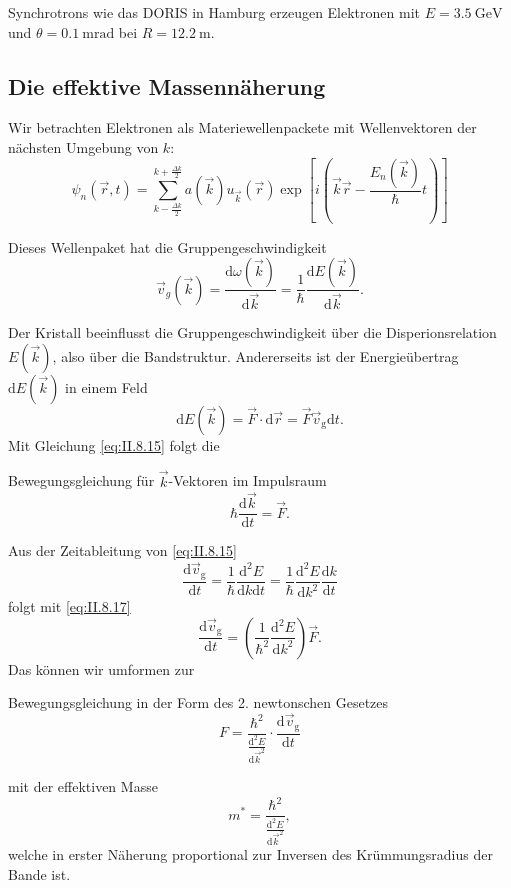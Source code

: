 	Synchrotrons wie das DORIS in Hamburg erzeugen Elektronen mit $E=\SI{3,5}{\giga\electronvolt}$ und $\theta=\SI{0,1}{\milli\radian}$ bei $R=\SI{12.2}{\meter}$.
	
\subsection{Die effektive Massennäherung}
	Wir betrachten Elektronen als Materiewellenpackete mit Wellenvektoren der nächsten Umgebung von $k$:
	$$
	\psi_{n} (\Vec{r},t) = \sum_{k- \frac{\Delta k}{2}}^{k+ \frac{\Delta k}{2}} a(\Vec{k}) u_{\Vec{k}} (\Vec{r}) \exp\left[ i \left( \Vec{k}\Vec{r} - \frac{E_{n}(\Vec{k})}{\hbar }t \right)  \right]
	$$ 

	Dieses Wellenpaket hat die Gruppengeschwindigkeit
	\begin{equation}
		\label{eq:II.8.15}
		\Vec{v}_{g}(\Vec{k}) = \frac{\mathrm{d}\omega(\Vec{k})}{\mathrm{d}\Vec{k}} = \frac{1}{\hbar } \frac{\mathrm{d}E(\Vec{k})}{\mathrm{d}\Vec{k}}.
	\end{equation}

	Der Kristall beeinflusst die Gruppengeschwindigkeit über die Disperionsrelation $E(\Vec{k})$, also über die Bandstruktur. 
	Andererseits ist der Energieübertrag $\mathrm{d}E(\Vec{k})$ in einem Feld
	\begin{equation}
		\label{eq:II.8.16}
		\mathrm{d} E(\Vec{k}) = \Vec{F} \cdot \mathrm{d}\Vec{r} = \Vec{F} \Vec{v}_{\mathrm{g}} \mathrm{d}t.
	\end{equation}
	Mit Gleichung \eqref{eq:II.8.15} folgt die
	\begin{important}
		Bewegungsgleichung für $\vec k$-Vektoren im Impulsraum
		\begin{equation}
			\label{eq:II.8.17}
			\hbar  \frac{\mathrm{d}\Vec{k}}{\mathrm{d}t} = \Vec{F}.
		\end{equation}
	\end{important}
	
	Aus der Zeitableitung von \eqref{eq:II.8.15}
	$$
	\frac{\mathrm{d}\Vec{v}_{\mathrm{g}}}{\mathrm{d}t} = \frac{1}{\hbar } \frac{\mathrm{d}^2 E}{\mathrm{d}k \mathrm{d}t} = \frac{1}{\hbar } \frac{\mathrm{d}^2 E}{\mathrm{d}k^2} \frac{\mathrm{d}k}{\mathrm{d}t}
	$$ 
	folgt mit \eqref{eq:II.8.17}
	$$
	\frac{\mathrm{d} \Vec{v}_{\mathrm{g}}}{\mathrm{d}t} = \left( \frac{1}{\hbar ^2} \frac{\mathrm{d}^2 E}{\mathrm{d}k^2} \right) \Vec{F}.
	$$ 
	Das können wir umformen zur
	\begin{important}
		Bewegungsgleichung in der Form des 2. newtonschen Gesetzes
		\begin{equation}
			\label{eq:II.8.18}
			F = \frac{\hbar ^2}{ \frac{\mathrm{d}^2 E}{\mathrm{d} \Vec{k}^2}} \cdot \frac{\mathrm{d} \Vec{v}_{\mathrm{g}}}{\mathrm{d}t}
		\end{equation}
	\end{important}
	mit der effektiven Masse
	$$
	m^{*} = \frac{\hbar ^2}{ \frac{\mathrm{d}^2 E}{\mathrm{d}\Vec{k}^2}},
	$$ 
	welche in erster Näherung proportional zur Inversen des Krümmungsradius der Bande ist.
